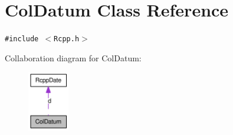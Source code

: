 \hypertarget{classColDatum}{
\section{ColDatum Class Reference}
\label{classColDatum}
}
{\tt \#include $<$Rcpp.h$>$}

Collaboration diagram for ColDatum:\nopagebreak
\begin{figure}[H]
\begin{center}
\leavevmode
\includegraphics[width=51pt]{classColDatum__coll__graph}
\end{center}
\end{figure}
